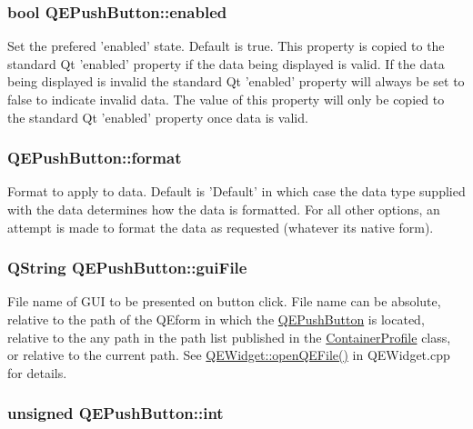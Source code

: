\hypertarget{classQEPushButton_a223d8878ab3e235c7da509731d489737}{
\subsubsection[{enabled}]{\setlength{\rightskip}{0pt plus 5cm}bool QEPushButton::enabled}}
\label{classQEPushButton_a223d8878ab3e235c7da509731d489737}
Set the prefered 'enabled' state. Default is true. This property is copied to the standard Qt 'enabled' property if the data being displayed is valid. If the data being displayed is invalid the standard Qt 'enabled' property will always be set to false to indicate invalid data. The value of this property will only be copied to the standard Qt 'enabled' property once data is valid. \hypertarget{classQEPushButton_abd4b0d3b48e4e819f9a89f37b34c4df1}{
\subsubsection[{format}]{ QEPushButton::format}}
\label{classQEPushButton_abd4b0d3b48e4e819f9a89f37b34c4df1}
Format to apply to data. Default is 'Default' in which case the data type supplied with the data determines how the data is formatted. For all other options, an attempt is made to format the data as requested (whatever its native form). \hypertarget{classQEPushButton_a463afceced7f64ea2f738a69e9db425b}{
\subsubsection[{guiFile}]{\setlength{\rightskip}{0pt plus 5cm}QString QEPushButton::guiFile}}
\label{classQEPushButton_a463afceced7f64ea2f738a69e9db425b}
File name of GUI to be presented on button click. File name can be absolute, relative to the path of the QEform in which the \hyperlink{classQEPushButton}{QEPushButton} is located, relative to the any path in the path list published in the \hyperlink{classContainerProfile}{ContainerProfile} class, or relative to the current path. See \hyperlink{classQEWidget_a1249c1c022d5ec63e0fa82df20356039}{QEWidget::openQEFile()} in QEWidget.cpp for details. \hypertarget{classQEPushButton_af2101a8ce89f2fa34261cc8b6d2d4715}{
\subsubsection[{int}]{\setlength{\rightskip}{0pt plus 5cm}unsigned QEPushButton::int}}
